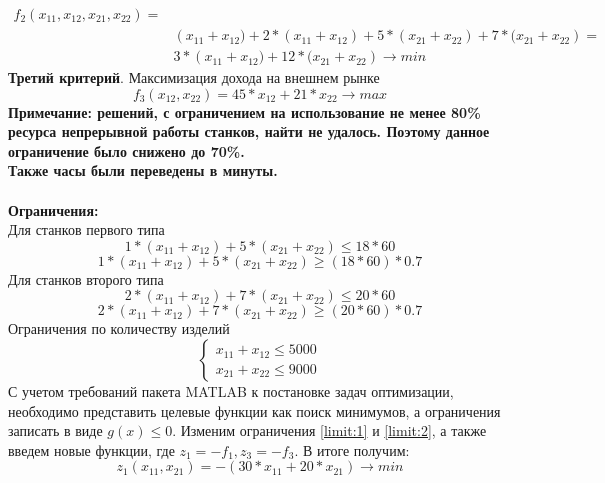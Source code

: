 \begin{equation}
\begin{split}
f_2 (x_{11}, x_{12}, x_{21}, x_{22})=\\ &
\left(x_{11}+x_{12})+2*(x_{11}+x_{12})+5*(x_{21}+x_{22})+7*(x_{21}+x_{22}\right)=\\ & 
3*\left(x_{11}+x_{12})+12*(x_{21}+x_{22}\right) \rightarrow min
\end{split}
\end{equation}
\textbf{Третий критерий}. Максимизация дохода на внешнем рынке
\begin{equation}
f_3 (x_{12}, x_{22})= 45*x_{12}+21*x_{22} \rightarrow max
\end{equation}
\textbf{Примечание: решений, с ограничением на использование не менее 80\% ресурса непрерывной работы станков, найти не удалось. Поэтому данное ограничение было снижено до 70\%.}\\
\textbf{Также часы были переведены в минуты.}\\\\
\textbf{Ограничения:}\\
Для станков первого типа
\begin{equation}
1*(x_{11}+x_{12})+5*(x_{21}+x_{22})\leq 18*60
\end{equation}
\begin{equation} \label{limit:1}
1*(x_{11}+x_{12})+5*(x_{21}+x_{22})\geq (18*60)*0.7
\end{equation}
Для станков второго типа
\begin{equation}
2*(x_{11}+x_{12})+7*(x_{21}+x_{22})\leq 20*60
\end{equation}
\begin{equation} \label{limit:2}
2*(x_{11}+x_{12})+7*(x_{21}+x_{22})\geq (20*60)*0.7
\end{equation}
Ограничения по количеству изделий
\begin{equation}
\begin{cases}
x_{11}+x_{12}\leq 5000\\
x_{21}+x_{22}\leq 9000
\end{cases}
\end{equation}
С учетом требований пакета MATLAB к постановке задач оптимизации, необходимо представить целевые функции как поиск минимумов, а ограничения записать в виде $g(x) \leq 0$. Изменим ограничения \ref{limit:1} и \ref{limit:2}, а также введем новые функции, где $z_1=-f_1, z_3=-f_3$. В итоге получим:
\begin{equation}
z_1 (x_{11}, x_{21})=-(30*x_{11}+20*x_{21}) \rightarrow min 
\end{equation}
